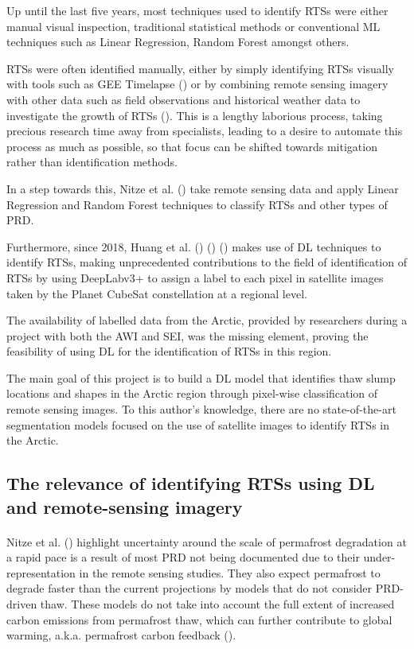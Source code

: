 Up until the last five years, most techniques used to identify \gls{RTS}s were either manual visual inspection, traditional statistical methods or conventional \gls{ML} techniques such as Linear Regression, Random Forest amongst others.

\gls{RTS}s were often identified manually, either by simply identifying \gls{RTS}s visually with tools such as \gls{GEE} Timelapse (\cite{lewkowicz_extremes_2019}) or by combining remote sensing imagery with other data such as field observations and historical weather data to investigate the growth of \gls{RTS}s (\cite{KOKELJ201556}). This is a lengthy laborious process, taking precious research time away from specialists, leading to a desire to automate this process as much as possible, so that focus can be shifted towards mitigation rather than identification methods.

In a step towards this, Nitze et al. (\cite{articleing2018}) take remote sensing data and apply Linear Regression and Random Forest techniques to classify \gls{RTS}s and other types of \gls{PRD}.

Furthermore, since 2018, Huang et al. (\cite{HUANG10122067}) (\cite{HUANG2020111534}) (\cite{HUANG2021102399}) makes use of \gls{DL} techniques to identify \gls{RTS}s, making unprecedented contributions to the field of identification of \gls{RTS}s by using DeepLabv3+ to assign a label to each pixel in satellite images taken by the Planet CubeSat constellation at a regional level.

The availability of labelled data from the Arctic, provided by researchers during a project with both the \gls{AWI} and \gls{SEI}, was the missing element, proving the feasibility of using DL for the identification of \gls{RTS}s in this region.

The main goal of this project is to build a \gls{DL} model that identifies thaw slump locations and shapes in the Arctic region through pixel-wise classification of remote sensing images. 
To this author's knowledge, there are no state-of-the-art segmentation models focused on the use of satellite images to identify \gls{RTS}s in the Arctic.

\subsection{The relevance of identifying \gls{RTS}s using \gls{DL} and remote-sensing imagery} \label{rts_ref}
\paragraph{}
Nitze et al. (\cite{articleing2018}) highlight uncertainty around the scale of permafrost degradation at a rapid pace is a result of most \gls{PRD} not being documented due to their under-representation in the remote sensing studies. 
They also expect permafrost to degrade faster than the current projections by models that do not consider \gls{PRD}-driven thaw. These models do not take into account the full extent of increased carbon emissions from permafrost thaw, which can further contribute to global warming, \gls{a.k.a.} permafrost carbon feedback (\cite{articlecarbonfeedback}).

